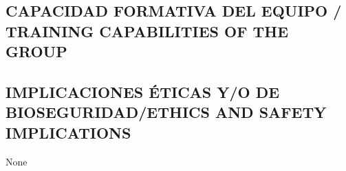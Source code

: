 \documentclass[a4paper,11pt,oneside]{article}
\begin{document}

\subsection{CAPACIDAD FORMATIVA DEL EQUIPO / TRAINING CAPABILITIES OF THE GROUP}


%
%
%
%


\subsection{IMPLICACIONES ÉTICAS Y/O DE BIOSEGURIDAD/ETHICS AND SAFETY IMPLICATIONS}

None
\end{document}
